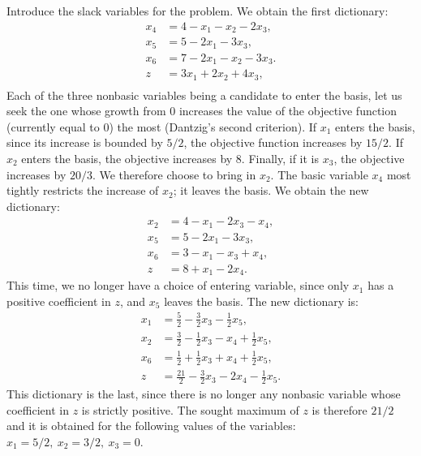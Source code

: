 \begin{example}
    Introduce the slack variables for the problem. We obtain the first dictionary:
    \[
        \begin{aligned}
        x_4 &= 4 - x_1 - x_2 - 2x_3,\\
        x_5 &= 5 - 2x_1 - 3x_3,\\
        x_6 &= 7 - 2x_1 - x_2 - 3x_3. \\
        \hline
        z &= 3x_1 + 2x_2 + 4x_3,\\
        \end{aligned}
    \]
    Each of the three nonbasic variables being a candidate to enter the basis, let us seek the one whose growth from \(0\) increases the value of the objective function (currently equal to \(0\)) the most (Dantzig’s second criterion). If \(x_1\) enters the basis, since its increase is bounded by \(5/2\), the objective function increases by \(15/2\). If \(x_2\) enters the basis, the objective increases by \(8\). Finally, if it is \(x_3\), the objective increases by \(20/3\). We therefore choose to bring in \(x_2\). The basic variable \(x_4\) most tightly restricts the increase of \(x_2\); it leaves the basis. We obtain the new dictionary:
    \[
        \begin{aligned}
        x_2 &= 4 - x_1 - 2x_3 - x_4,\\
        x_5 &= 5 - 2x_1 - 3x_3,\\
        x_6 &= 3 - x_1 - x_3 + x_4,\\
        \hline
        z &= 8 + x_1 - 2x_4.
        \end{aligned}
    \]
    This time, we no longer have a choice of entering variable, since only \(x_1\) has a positive coefficient in \(z\), and \(x_5\) leaves the basis. The new dictionary is:
    \[
        \begin{aligned}
        x_1 &= \tfrac{5}{2} - \tfrac{3}{2}x_3 - \tfrac{1}{2}x_5,\\
        x_2 &= \tfrac{3}{2} - \tfrac{1}{2}x_3 - x_4 + \tfrac{1}{2}x_5,\\
        x_6 &= \tfrac{1}{2} + \tfrac{1}{2}x_3 + x_4 + \tfrac{1}{2}x_5,\\
        \hline
        z &= \tfrac{21}{2} - \tfrac{3}{2}x_3 - 2x_4 - \tfrac{1}{2}x_5.
        \end{aligned}
    \]
    This dictionary is the last, since there is no longer any nonbasic variable whose coefficient in \(z\) is strictly positive. The sought maximum of \(z\) is therefore \(21/2\) and it is obtained for the following values of the variables: \(x_1 = 5/2,\ x_2 = 3/2,\ x_3 = 0\).
\end{example}

